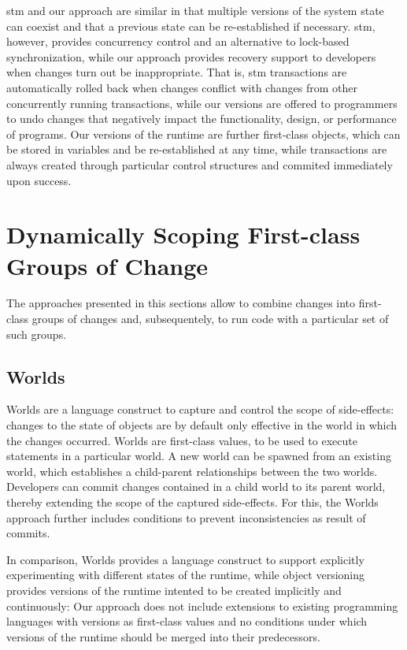 \ac{stm} and our approach are similar in that multiple versions of the system state can coexist and that a previous state can be re-established if necessary.
\ac{stm}, however, provides concurrency control and an alternative to lock-based synchronization, while our approach provides recovery support to developers when changes turn out be inappropriate.
That is, \ac{stm} transactions are automatically rolled back when changes conflict with changes from other concurrently running transactions, while our versions are offered to programmers to undo changes that negatively impact the functionality, design, or performance of programs. 
Our versions of the runtime are further first-class objects, which can be stored in variables and be re-established at any time, while transactions are always created through particular control structures and commited immediately upon success.



\section{Dynamically Scoping First-class Groups of Change}

The approaches presented in this sections allow to combine changes into first-class groups of changes and, subsequentely, to run code with a particular set of such groups.


\subsection{Worlds}

Worlds are a language construct to capture and control the scope of side-effects: changes to the state of objects are by default only effective in the world in which the changes occurred.
Worlds are first-class values, to be used to execute statements in a particular world.
A new world can be spawned from an existing world, which establishes a child-parent relationships between the two worlds.
Developers can commit changes contained in a child world to its parent world, thereby extending the scope of the captured side-effects.
For this, the Worlds approach further includes conditions to prevent inconsistencies as result of commits.

In comparison, Worlds provides a language construct to support explicitly experimenting with different states of the runtime, while object versioning provides versions of the runtime intented to be created implicitly and continuously: Our approach does not include extensions to existing programming languages with versions as first-class values and no conditions under which versions of the runtime should be merged into their predecessors.

